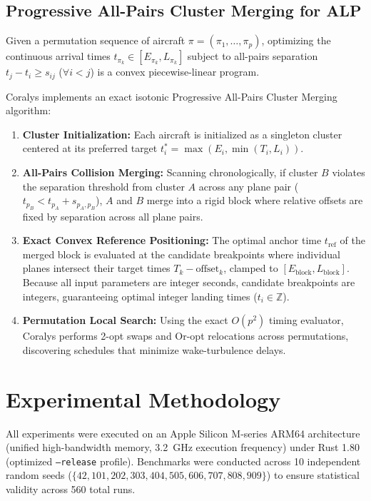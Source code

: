 \documentclass[10pt,journal,compsoc]{IEEEtran}
\begin{document}
\subsection{Progressive All-Pairs Cluster Merging for ALP}
Given a permutation sequence of aircraft $\pi = (\pi_1, \dots, \pi_p)$, optimizing the continuous arrival times $t_{\pi_k} \in [E_{\pi_k}, L_{\pi_k}]$ subject to all-pairs separation $t_j - t_i \ge s_{ij}$ ($\forall i < j$) is a convex piecewise-linear program. 

Coralys implements an exact isotonic Progressive All-Pairs Cluster Merging algorithm:
\begin{enumerate}
    \item \textbf{Cluster Initialization:} Each aircraft is initialized as a singleton cluster centered at its preferred target $t^*_i = \max(E_i, \min(T_i, L_i))$.
    \item \textbf{All-Pairs Collision Merging:} Scanning chronologically, if cluster $B$ violates the separation threshold from cluster $A$ across any plane pair ($t_{p_B} < t_{p_A} + s_{p_A, p_B}$), $A$ and $B$ merge into a rigid block where relative offsets are fixed by separation across all plane pairs.
    \item \textbf{Exact Convex Reference Positioning:} The optimal anchor time $t_{\text{ref}}$ of the merged block is evaluated at the candidate breakpoints where individual planes intersect their target times $T_k - \text{offset}_k$, clamped to $[E_{\text{block}}, L_{\text{block}}]$. Because all input parameters are integer seconds, candidate breakpoints are integers, guaranteeing optimal integer landing times ($t_i \in \mathbb{Z}$).
    \item \textbf{Permutation Local Search:} Using the exact $O(p^2)$ timing evaluator, Coralys performs 2-opt swaps and Or-opt relocations across permutations, discovering schedules that minimize wake-turbulence delays.
\end{enumerate}

\section{Experimental Methodology}
\label{sec:experimental}

All experiments were executed on an Apple Silicon M-series ARM64 architecture (unified high-bandwidth memory, 3.2~GHz execution frequency) under Rust 1.80 (optimized \texttt{--release} profile). Benchmarks were conducted across 10 independent random seeds ($\{42, 101, 202, 303, 404, 505, 606, 707, 808, 909\}$) to ensure statistical validity across 560 total runs.
\end{document}
